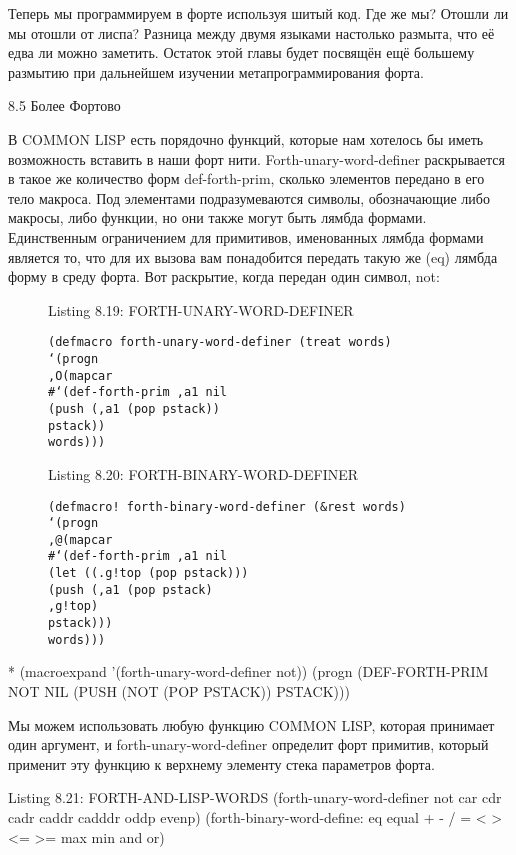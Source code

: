 {{{Теперь мы программируем в форте используя шитый код. Где же мы? Отошли ли мы отошли от лиспа? Разница между двумя языками настолько размыта, что её едва ли можно заметить. Остаток этой главы будет посвящён ещё большему размытию при дальнейшем изучении метапрограммирования форта.

8.5 Более Фортово

В COMMON LISP есть порядочно функций, которые нам хотелось бы иметь возможность вставить в наши форт нити. Forth-unary-word-definer раскрывается в такое же количество форм def-forth-prim, сколько элементов передано в его тело макроса. Под элементами подразумеваются символы,  обозначающие либо макросы, либо функции, но они также могут быть лямбда формами. Единственным ограничением для примитивов, именованных лямбда формами является то, что для их вызова вам понадобится передать такую же (eq) лямбда форму в среду форта. Вот раскрытие, когда передан один символ, not: 

\begin{figure}Listing 8.19: FORTH-UNARY-WORD-DEFINER\label{listing_8.19}
\listbegin
\begin{verbatim}
(defmacro forth-unary-word-definer (treat words)
‘(progn
,O(mapcar
#‘(def-forth-prim ,a1 nil
(push (,a1 (pop pstack))
pstack))
words)))
\end{verbatim}
\listend
\end{figure}

\begin{figure}Listing 8.20: FORTH-BINARY-WORD-DEFINER\label{listing_8.20}
\listbegin
\begin{verbatim}
(defmacro! forth-binary-word-definer (&rest words)
‘(progn
,@(mapcar
#‘(def-forth-prim ,a1 nil
(let ((.g!top (pop pstack)))
(push (,a1 (pop pstack)
,g!top)
pstack)))
words)))
\end{verbatim}
\listend
\end{figure}

* (macroexpand
’(forth-unary-word-definer
not))
(progn
(DEF-FORTH-PRIM NOT NIL
(PUSH (NOT (POP PSTACK))
PSTACK)))

Мы можем использовать любую функцию COMMON LISP, которая принимает один аргумент, и forth-unary-word-definer определит форт примитив, который применит эту функцию к верхнему элементу стека параметров форта.

Listing 8.21: FORTH-AND-LISP-WORDS
(forth-unary-word-definer
not car cdr cadr caddr cadddr
oddp evenp)
(forth-binary-word-define:
eq equal + - / = < > <= >=
max min and or)

}}}
